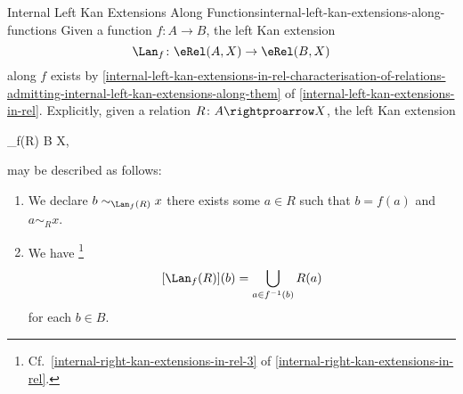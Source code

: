 \begin{example}{Internal Left Kan Extensions Along Functions}{internal-left-kan-extensions-along-functions}%
    Given a function $f\colon A\to B$, the left Kan extension
    \[
        \Lan_{f}%
        \colon%
        \eRel(A,X)%
        \to%
        \eRel(B,X)%
    \]%
    along $f$ exists by \cref{internal-left-kan-extensions-in-rel-characterisation-of-relations-admitting-internal-left-kan-extensions-along-them} of \cref{internal-left-kan-extensions-in-rel}. Explicitly, given a relation $R\colon A\rightproarrow X$, the left Kan extension
    \begin{webcompile}
        \Lan_{f}(R)%
        \colon%
        B%
        \rightproarrow%
        X,%
        \quad%
    \end{webcompile}
    may be described as follows:
    \begin{enumerate}
        \item\label{internal-left-kan-extensions-along-functions-1}We declare $b\sim_{\Lan_{f}(R)}x$ \textiff there exists some $a\in R$ such that $b=f(a)$ and $a\sim_{R}x$.
        \item\label{internal-left-kan-extensions-along-functions-2}We have%
            \footnote{%
                Cf.\ \cref{internal-right-kan-extensions-in-rel-3} of \cref{internal-right-kan-extensions-in-rel}.
            }%
            \[
                [\Lan_{f}(R)](b)%
                =%
                \bigcup_{a\in f^{-1}(b)}R(a)%
            \]%
            for each $b\in B$.
    \end{enumerate}
\end{example}
